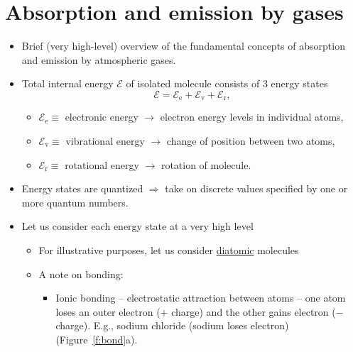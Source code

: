 \documentclass[11pt, oneside]{article}
\begin{document}
\section{Absorption and emission by gases}
\label{s:abs}

\begin{itemize}
	\item Brief (very high-level) overview of the fundamental concepts of absorption and emission by atmospheric gases.
	\item Total internal energy $\mathcal{E}$ of isolated molecule consists of 3 energy states
	\begin{equation}
		\label{e:U}
		\mathcal{E} = \mathcal{E}_\mathrm{e} + \mathcal{E}_\mathrm{v} + \mathcal{E}_\mathrm{r},
	\end{equation}
	\begin{itemize}
		\item[] $\mathcal{E}_\mathrm{e} \equiv$ electronic energy $\rightarrow$ electron energy levels in individual atoms,
		\item[] $\mathcal{E}_\mathrm{v} \equiv$ vibrational energy $\rightarrow$ change of position between two atoms,
		\item[] $\mathcal{E}_\mathrm{r} \equiv$ rotational energy $\rightarrow$ rotation of molecule.
	\end{itemize}
	\item Energy states are quantized $\Rightarrow$ take on discrete values specified by one or more quantum numbers.
	\item Let us consider each energy state at a very high level
	\begin{itemize}
		\item[--] For illustrative purposes, let us consider \underline{diatomic} molecules
		\item[--] A note on bonding:
		\begin{itemize}
			\item[--] Ionic bonding -- electrostatic attraction between atoms -- one atom loses an outer electron ($+$ charge) and the other gains electron ($-$ charge). E.g., sodium chloride (sodium loses electron) (Figure~\ref{f:bond}a).

\end{itemize}
\end{itemize}
\end{itemize}
\end{document}
